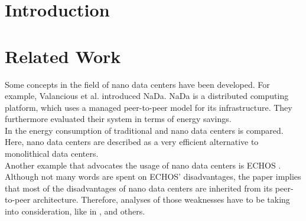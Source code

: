 \documentclass[sigchi-a, authorversion]{acmart}
\begin{document}

\maketitle

%  
%  
%  
%



\section{Introduction} %

\section{Related Work} %
Some concepts in the field of nano data centers have been developed. For example, Valancious et al. introduced NaDa. NaDa is a distributed computing platform, which uses a managed peer-to-peer model for its infrastructure. They furthermore evaluated their system in terms of energy savings. \\
In \cite{DBLP:journals/sigmetrics/JalaliAVHAT14} the energy consumption of traditional and nano data centers is compared. Here, nano data centers are described as a very efficient alternative to monolithical data centers.\\
Another example that advocates the usage of nano data centers is ECHOS \cite{Laoutaris:2008:EEC:1341431.1341442}. Although not many words are spent on ECHOS' disadvantages, the paper implies that most of the disadvantages of nano data centers are inherited from its peer-to-peer architecture. Therefore, analyses of those weaknesses have to be taking into consideration, like in \cite{Dumitriu:2005:DoS}, \cite{Mhapasekar:2011:anonymity} and others.
\\
\end{document}
